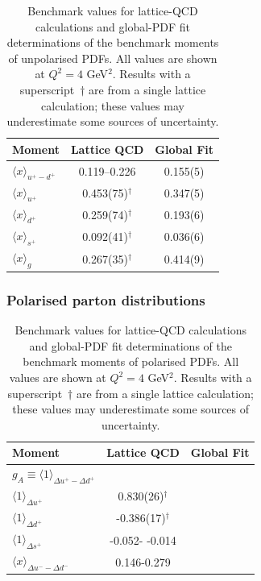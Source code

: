 \begin{table}[t]
\centering
\begin{tabular}{lcc}
\toprule
Moment & Lattice QCD & Global Fit\\
\midrule
$\langle x \rangle_{u^+ -d^+}$ 
& \numrange{0.119}{0.226} 
& 0.155(5)\\
$\langle x \rangle_{u^+}$     
& 0.453(75)$^\dagger$ 
& 0.347(5)\\
$\langle x \rangle_{d^+}$     
& 0.259(74)$^\dagger$ 
& 0.193(6)\\
$\langle x \rangle_{s^+}$     
& 0.092(41)$^\dagger$ 
& 0.036(6)\\
$\langle x\rangle_{g}$       
& 0.267(35)$^\dagger$ 
& 0.414(9)\\
\bottomrule
\end{tabular}
\caption{\small Benchmark values for lattice-QCD calculations and global-PDF 
fit determinations of the benchmark moments of unpolarised PDFs.
%
All values are shown at $Q^2=4$ GeV$^2$.
%
Results with a superscript~$\dagger$ are from a single lattice 
calculation; these values may underestimate some sources of uncertainty.}
\label{tab:LQCDunpol}
\end{table}

\subsubsection{Polarised parton distributions}

\begin{table}[t]
\centering
\begin{tabular}{lcc}
\toprule
Moment & Lattice QCD & Global Fit\\
\midrule
$g_A\equiv\langle 1\rangle_{\Delta u^+ - \Delta d^+}$ 
&  
& \\
$\langle 1 \rangle_{\Delta u^+}$     
& 0.830(26)$^\dagger$ 
& \\
$\langle 1 \rangle_{\Delta d^+}$     
& -0.386(17)$^\dagger$ 
& \\
$\langle 1 \rangle_{\Delta s^+}$     
& -0.052- -0.014
& \\
$\langle x\rangle_{\Delta u^- - \Delta d^-}$       
& 0.146-0.279 
& \\
\bottomrule
\end{tabular}
\caption{\small Benchmark values for lattice-QCD calculations and global-PDF 
fit determinations of the benchmark moments of polarised PDFs.
%
All values are shown at $Q^2=4$ GeV$^2$.
%
Results with a superscript~$\dagger$ are from a single lattice 
calculation; these values may underestimate some sources of uncertainty.}
\label{tab:LQCDunpol}
\end{table}











